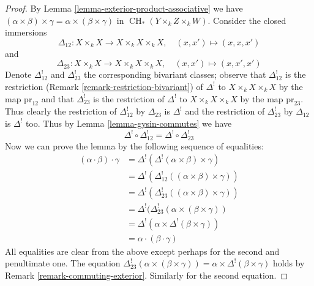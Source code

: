 \documentclass[10pt,a4paper]{amsart}
\theoremstyle{plain}
\theoremstyle{definition}
\theoremstyle{remark}
\numberwithin{equation}{subsection}
\def\CH{\mathop{\mathrm{CH}}\nolimits}
\begin{document}
\begin{proof}
By Lemma \ref{lemma-exterior-product-associative} we have
$(\alpha \times \beta) \times \gamma =
\alpha \times (\beta \times \gamma)$ in $\CH_*(Y \times_k Z \times_k W)$.
Consider the closed immersions
$$
\Delta_{12} : X \times_k X \longrightarrow X \times_k X \times_k X,
\quad (x, x') \mapsto (x, x, x')
$$
and
$$
\Delta_{23} : X \times_k X \longrightarrow X \times_k X \times_k X,
\quad (x, x') \mapsto (x, x', x')
$$
Denote $\Delta_{12}^!$ and $\Delta_{23}^!$ the corresponding bivariant
classes; observe that $\Delta_{12}^!$ is the restriction
(Remark \ref{remark-restriction-bivariant}) of $\Delta^!$
to $X \times_k X \times_k X$ by the map $\text{pr}_{12}$ and that
$\Delta_{23}^!$ is the restriction of $\Delta^!$
to $X \times_k X \times_k X$ by the map $\text{pr}_{23}$.
Thus clearly the restriction of $\Delta_{12}^!$ by $\Delta_{23}$
is $\Delta^!$ and the restriction of $\Delta_{23}^!$ by $\Delta_{12}$ is
$\Delta^!$ too. Thus by Lemma \ref{lemma-gysin-commutes} we have
$$
\Delta^! \circ \Delta_{12}^! =
\Delta^! \circ \Delta_{23}^! 
$$
Now we can prove the lemma by the following sequence of equalities:
\begin{align*}
(\alpha \cdot \beta) \cdot \gamma
& =
\Delta^!(\Delta^!(\alpha \times \beta) \times \gamma) \\
& =
\Delta^!(\Delta_{12}^!((\alpha \times \beta) \times \gamma)) \\
& =
\Delta^!(\Delta_{23}^!((\alpha \times \beta) \times \gamma)) \\
& =
\Delta^!(\Delta_{23}^!(\alpha \times (\beta \times \gamma)) \\
& =
\Delta^!(\alpha \times \Delta^!(\beta \times \gamma)) \\
& =
\alpha \cdot (\beta \cdot \gamma)
\end{align*}
All equalities are clear from the above except perhaps
for the second and penultimate one. The equation
$\Delta_{23}^!(\alpha \times (\beta \times \gamma)) =
\alpha \times \Delta^!(\beta \times \gamma)$ holds by
Remark \ref{remark-commuting-exterior}. Similarly for the second
equation.
\end{proof}
\end{document}
